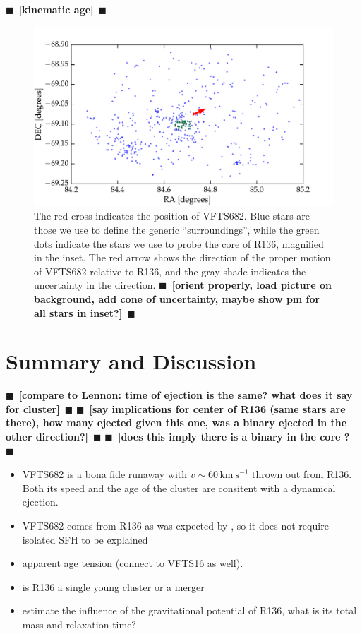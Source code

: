 \documentclass{aa}
\newcommand{\todo}[1]{{\large $\blacksquare$~\textbf{\color{red}[#1]}}~$\blacksquare$}
\begin{document}
\todo{kinematic age}


\begin{figure}[htbp]
  \centering
  \includegraphics[width=\textwidth]{./figures/main_plot}  
  \caption{The red cross indicates the position of VFTS682. Blue stars
    are those we use to define the generic ``surroundings'', while the
    green dots indicate the stars we use to probe the core of R136,
    magnified in the inset. The red arrow shows the direction of the
    proper motion of VFTS682 relative to R136, and the gray shade
    indicates the uncertainty in the direction. \todo{orient properly, load  picture on background, add cone
      of uncertainty, maybe show pm for all stars in inset?}}
  \label{fig:main}
\end{figure}

\section{Summary and Discussion}
\label{sec:discussion}

\todo{compare to Lennon: time of ejection is the same? what does it
  say for cluster}
\todo{say implications for center of R136 (same stars are there), how
  many ejected given this one, was a binary ejected in the other direction?}
\todo{does this imply there is a binary in the core ?}
\begin{itemize}
\item VFTS682 is a bona fide runaway with $v\sim60\,\mathrm{km\
    s^{-1}}$ thrown out from R136. Both its speed and the age of the
  cluster are consitent with a dynamical ejection.
  \item VFTS682 comes from R136 as was expected by
  \cite{bestenlehner:11, fujii:11, banerjee:12}, so it does not
  require isolated SFH to be explained
\item apparent age tension (connect to VFTS16 as well).
\item is R136 a single young cluster or a merger
\item estimate the influence of the gravitational potential of R136,
  what is its total mass and relaxation time?
\end{itemize}
\end{document}
